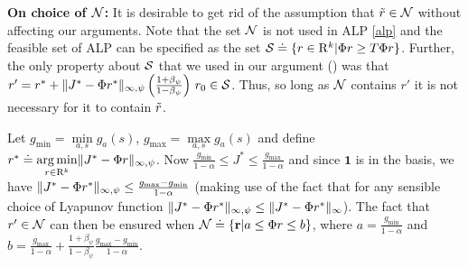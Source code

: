 \begin{appendix}
\textbf{On choice of $\N$:}
It is desirable to get rid of the assumption that $\tr\in \N$ without affecting our arguments. Note that the set $\N$ is not used in ALP \eqref{alp} and the feasible set of ALP can be specified as the set $\S\eqdef\{r\in \R^k| \Phi r \geq T\Phi r\}$. Further, the only property about $\S$ that we used in our argument () was that $r'= r^*+\norm{J^*-\Phi r^*}_{\mn} \left(\frac{1+\beta_{\psi}}{1-\beta_{\psi}}\right)\, r_0 \in \S$. Thus, so long as $\N$ contains $r'$ it is not necessary for it to contain $\tr$.\par
Let $g_{\min}=\underset{a,s}{\min}g_a(s)$, $g_{\max}=\underset{a,s}{\max}g_a(s)$ and define $r^*\eqdef\underset{r\in \R^k}{\arg\min}\norm{J^*-\Phi r}_{\mn}$. Now $\frac{g_{\min}}{1-\alpha}\leq J^* \leq \frac{g_{\max}}{1-\alpha}$ and since $\mathbf{1}$ is in the basis, we have $\norm{J^*-\Phi r^*}_{\mn}\leq \frac{g_{\max}-g_{\min}}{1-\alpha}$ (making use of the fact that for any sensible choice of Lyapunov function $\norm{J^*-\Phi r^*}_{\mn}\leq \norm{J^*-\Phi r^*}_{\infty}$).  The fact that $r'\in \N$ can then be ensured when $\N\eqdef\{\r| a\leq \Phi r\leq b\}$, where $a=\frac{g_{\min}}{1-\alpha}$ and $b=\frac{g_{\max}}{1-\alpha}+\frac{1+\beta_{\psi}}{1-\beta_{\psi}}\frac{g_{\max}-g_{\min}}{1-\alpha}$.
\end{appendix}
